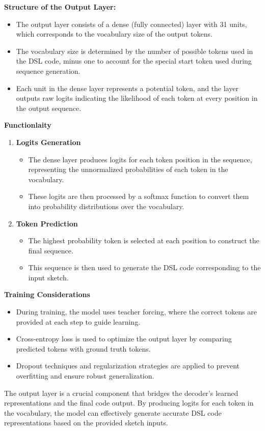 \textbf{Structure of the Output Layer:}
\begin{itemize}
    \item The output layer consists of a dense (fully connected) layer with 31 units, which corresponds to the vocabulary size of the output tokens.
    \item The vocabulary size is determined by the number of possible tokens used in the DSL code, minus one to account for the special start token used during sequence generation.
    \item Each unit in the dense layer represents a potential token, and the layer outputs raw logits indicating the likelihood of each token at every position in the output sequence.
\end{itemize}
\textbf{Functionlaity}
\begin{enumerate}[label=\textbf{\roman*})]
    \item \textbf{Logits Generation} 
    \begin{itemize}
        \item The dense layer produces logits for each token position in the sequence, representing the unnormalized probabilities of each token in the vocabulary.
        \item These logits are then processed by a softmax function to convert them into probability distributions over the vocabulary.
    \end{itemize}
    
    \item \textbf{Token Prediction} 
    \begin{itemize}
        \item The highest probability token is selected at each position to construct the final sequence.
        \item This sequence is then used to generate the DSL code corresponding to the input sketch.
    \end{itemize}
\end{enumerate}
\textbf{Training Considerations}
\begin{itemize}
    \item During training, the model uses teacher forcing, where the correct tokens are provided at each step to guide learning.
    \item Cross-entropy loss is used to optimize the output layer by comparing predicted tokens with ground truth tokens.
    \item Dropout techniques and regularization strategies are applied to prevent overfitting and ensure robust generalization.
\end{itemize}
The output layer is a crucial component that bridges the decoder's learned representations and the final code output. By producing logits for each token in the vocabulary, the model can effectively generate accurate DSL code representations based on the provided sketch inputs.
